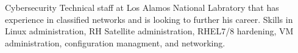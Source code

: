 

\begin{cvparagraph}

Cybersecurity Technical staff at Los Alamos National Labratory that has experience in classified networks and is looking to further his career. Skills in Linux administration, RH Satellite administration, RHEL7/8 hardening, VM administration, configuration managment, and networking.
\end{cvparagraph}
